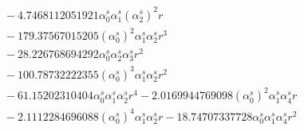 \documentclass[10pt]{article}
\begin{document}
\begin{align*}
&{}  - 4.7468112051921 \alpha_{0}^s \alpha_{1}^s \left(\alpha_{2}^s\right)^{2} r \\
&{}  - 179.37567015205 \left(\alpha_{0}^s\right)^{2} \alpha_{1}^s \alpha_{2}^s r^{3} \\
&{}  - 28.226768694292 \alpha_{0}^s \alpha_{2}^s \alpha_{3}^s r^{2} \\
&{}  - 100.78732222355 \left(\alpha_{0}^s\right)^{3} \alpha_{1}^s \alpha_{2}^s r^{2} \\
&{}  - 61.15202310404 \alpha_{0}^s \alpha_{1}^s \alpha_{2}^s r^{4} - 2.0169944769098 \left(\alpha_{0}^s\right)^{2} \alpha_{1}^s \alpha_{4}^s r \\
&{}  - 2.1112284696088 \left(\alpha_{0}^s\right)^{4} \alpha_{1}^s \alpha_{2}^s r - 18.74707337728 \alpha_{0}^s \alpha_{1}^s \alpha_{4}^s r^{2}
\end{align*}
\end{document}
